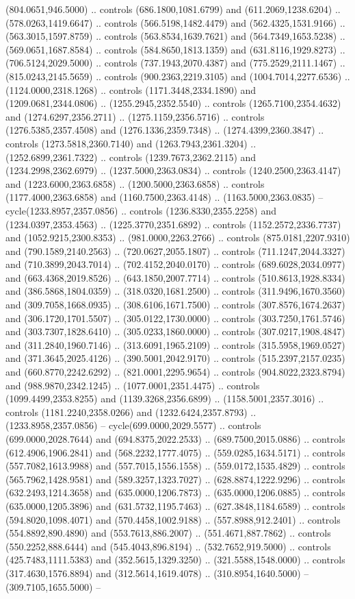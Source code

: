 (804.0651,946.5000) .. controls (686.1800,1081.6799) and (611.2069,1238.6204) .. (578.0263,1419.6647) .. controls (566.5198,1482.4479) and (562.4325,1531.9166) .. (563.3015,1597.8759) .. controls (563.8534,1639.7621) and (564.7349,1653.5238) .. (569.0651,1687.8584) .. controls (584.8650,1813.1359) and (631.8116,1929.8273) .. (706.5124,2029.5000) .. controls (737.1943,2070.4387) and (775.2529,2111.1467) .. (815.0243,2145.5659) .. controls (900.2363,2219.3105) and (1004.7014,2277.6536) .. (1124.0000,2318.1268) .. controls (1171.3448,2334.1890) and (1209.0681,2344.0806) .. (1255.2945,2352.5540) .. controls (1265.7100,2354.4632) and (1274.6297,2356.2711) .. (1275.1159,2356.5716) .. controls (1276.5385,2357.4508) and (1276.1336,2359.7348) .. (1274.4399,2360.3847) .. controls (1273.5818,2360.7140) and (1263.7943,2361.3204) .. (1252.6899,2361.7322) .. controls (1239.7673,2362.2115) and (1234.2998,2362.6979) .. (1237.5000,2363.0834) .. controls (1240.2500,2363.4147) and (1223.6000,2363.6858) .. (1200.5000,2363.6858) .. controls (1177.4000,2363.6858) and (1160.7500,2363.4148) .. (1163.5000,2363.0835) -- cycle(1233.8957,2357.0856) .. controls (1236.8330,2355.2258) and (1234.0397,2353.4563) .. (1225.3770,2351.6892) .. controls (1152.2572,2336.7737) and (1052.9215,2300.8353) .. (981.0000,2263.2766) .. controls (875.0181,2207.9310) and (790.1589,2140.2563) .. (720.0627,2055.1807) .. controls (711.1247,2044.3327) and (710.3899,2043.7014) .. (702.4152,2040.0170) .. controls (689.6028,2034.0977) and (663.4368,2019.8526) .. (643.1850,2007.7714) .. controls (510.8613,1928.8334) and (386.5868,1804.0359) .. (318.0320,1681.2500) .. controls (311.9496,1670.3560) and (309.7058,1668.0935) .. (308.6106,1671.7500) .. controls (307.8576,1674.2637) and (306.1720,1701.5507) .. (305.0122,1730.0000) .. controls (303.7250,1761.5746) and (303.7307,1828.6410) .. (305.0233,1860.0000) .. controls (307.0217,1908.4847) and (311.2840,1960.7146) .. (313.6091,1965.2109) .. controls (315.5958,1969.0527) and (371.3645,2025.4126) .. (390.5001,2042.9170) .. controls (515.2397,2157.0235) and (660.8770,2242.6292) .. (821.0001,2295.9654) .. controls (904.8022,2323.8794) and (988.9870,2342.1245) .. (1077.0001,2351.4475) .. controls (1099.4499,2353.8255) and (1139.3268,2356.6899) .. (1158.5001,2357.3016) .. controls (1181.2240,2358.0266) and (1232.6424,2357.8793) .. (1233.8958,2357.0856) -- cycle(699.0000,2029.5577) .. controls (699.0000,2028.7644) and (694.8375,2022.2533) .. (689.7500,2015.0886) .. controls (612.4906,1906.2841) and (568.2232,1777.4075) .. (559.0285,1634.5171) .. controls (557.7082,1613.9988) and (557.7015,1556.1558) .. (559.0172,1535.4829) .. controls (565.7962,1428.9581) and (589.3257,1323.7027) .. (628.8874,1222.9296) .. controls (632.2493,1214.3658) and (635.0000,1206.7873) .. (635.0000,1206.0885) .. controls (635.0000,1205.3896) and (631.5732,1195.7463) .. (627.3848,1184.6589) .. controls (594.8020,1098.4071) and (570.4458,1002.9188) .. (557.8988,912.2401) .. controls (554.8892,890.4890) and (553.7613,886.2007) .. (551.4671,887.7862) .. controls (550.2252,888.6444) and (545.4043,896.8194) .. (532.7652,919.5000) .. controls (425.7483,1111.5383) and (352.5615,1329.3250) .. (321.5588,1548.0000) .. controls (317.4630,1576.8894) and (312.5614,1619.4078) .. (310.8954,1640.5000) -- (309.7105,1655.5000) -- 